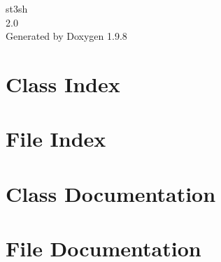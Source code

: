 \documentclass[twoside]{book}
\newcommand{\+}{\discretionary{\mbox{\scriptsize$\hookleftarrow$}}{}{}}
\newcommand{\clearemptydoublepage}{%
    \newpage{\pagestyle{empty}\cleardoublepage}%
  }
\begin{document}
  \raggedbottom
    \hypersetup{pageanchor=false,
                bookmarksnumbered=true,
                pdfencoding=unicode
               }
  \begin{titlepage}
  \vspace*{7cm}
  \begin{center}%
  {\Large st3sh}\\
  [1ex]\large 2.\+0 \\
  \vspace*{1cm}
  {\large Generated by Doxygen 1.9.8}\\
  \end{center}
  \end{titlepage}
  \clearemptydoublepage
  \tableofcontents
  \clearemptydoublepage
  \hypersetup{pageanchor=true}
\chapter{Class Index}

\chapter{File Index}

\chapter{Class Documentation}







\chapter{File Documentation}




























  \backmatter
  \newpage
  \clearemptydoublepage
  \printindex
\end{document}
